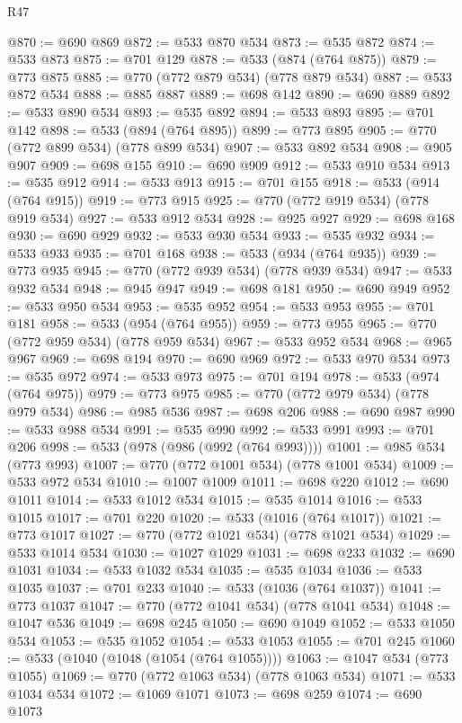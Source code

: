 \begin{lexlean}{R47}
\begin{coremodule}
@870 := @690 @869
@872 := @533 @870 @534
@873 := @535 @872
@874 := @533 @873
@875 := @701 @129
@878 := @533 (@874 (@764 @875))
@879 := @773 @875
@885 := @770 (@772 @879 @534) (@778 @879 @534)
@887 := @533 @872 @534
@888 := @885 @887
@889 := @698 @142
@890 := @690 @889
@892 := @533 @890 @534
@893 := @535 @892
@894 := @533 @893
@895 := @701 @142
@898 := @533 (@894 (@764 @895))
@899 := @773 @895
@905 := @770 (@772 @899 @534) (@778 @899 @534)
@907 := @533 @892 @534
@908 := @905 @907
@909 := @698 @155
@910 := @690 @909
@912 := @533 @910 @534
@913 := @535 @912
@914 := @533 @913
@915 := @701 @155
@918 := @533 (@914 (@764 @915))
@919 := @773 @915
@925 := @770 (@772 @919 @534) (@778 @919 @534)
@927 := @533 @912 @534
@928 := @925 @927
@929 := @698 @168
@930 := @690 @929
@932 := @533 @930 @534
@933 := @535 @932
@934 := @533 @933
@935 := @701 @168
@938 := @533 (@934 (@764 @935))
@939 := @773 @935
@945 := @770 (@772 @939 @534) (@778 @939 @534)
@947 := @533 @932 @534
@948 := @945 @947
@949 := @698 @181
@950 := @690 @949
@952 := @533 @950 @534
@953 := @535 @952
@954 := @533 @953
@955 := @701 @181
@958 := @533 (@954 (@764 @955))
@959 := @773 @955
@965 := @770 (@772 @959 @534) (@778 @959 @534)
@967 := @533 @952 @534
@968 := @965 @967
@969 := @698 @194
@970 := @690 @969
@972 := @533 @970 @534
@973 := @535 @972
@974 := @533 @973
@975 := @701 @194
@978 := @533 (@974 (@764 @975))
@979 := @773 @975
@985 := @770 (@772 @979 @534) (@778 @979 @534)
@986 := @985 @536
@987 := @698 @206
@988 := @690 @987
@990 := @533 @988 @534
@991 := @535 @990
@992 := @533 @991
@993 := @701 @206
@998 := @533 (@978 (@986 (@992 (@764 @993))))
@1001 := @985 @534 (@773 @993)
@1007 := @770 (@772 @1001 @534) (@778 @1001 @534)
@1009 := @533 @972 @534
@1010 := @1007 @1009
@1011 := @698 @220
@1012 := @690 @1011
@1014 := @533 @1012 @534
@1015 := @535 @1014
@1016 := @533 @1015
@1017 := @701 @220
@1020 := @533 (@1016 (@764 @1017))
@1021 := @773 @1017
@1027 := @770 (@772 @1021 @534) (@778 @1021 @534)
@1029 := @533 @1014 @534
@1030 := @1027 @1029
@1031 := @698 @233
@1032 := @690 @1031
@1034 := @533 @1032 @534
@1035 := @535 @1034
@1036 := @533 @1035
@1037 := @701 @233
@1040 := @533 (@1036 (@764 @1037))
@1041 := @773 @1037
@1047 := @770 (@772 @1041 @534) (@778 @1041 @534)
@1048 := @1047 @536
@1049 := @698 @245
@1050 := @690 @1049
@1052 := @533 @1050 @534
@1053 := @535 @1052
@1054 := @533 @1053
@1055 := @701 @245
@1060 := @533 (@1040 (@1048 (@1054 (@764 @1055))))
@1063 := @1047 @534 (@773 @1055)
@1069 := @770 (@772 @1063 @534) (@778 @1063 @534)
@1071 := @533 @1034 @534
@1072 := @1069 @1071
@1073 := @698 @259
@1074 := @690 @1073

\end{coremodule}
\end{lexlean}
